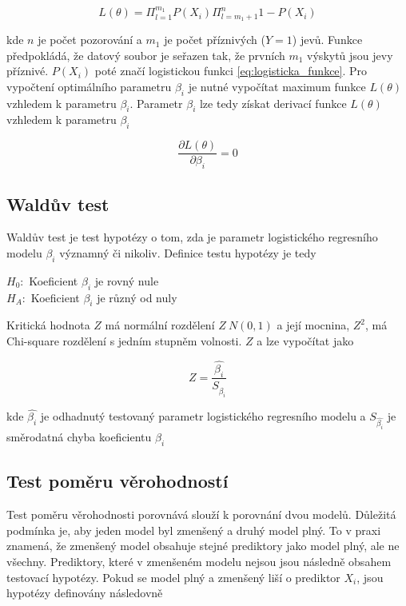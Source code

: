 \begin{equation}
    \label{eq:pravdepodobnostni_fce}
    L(\theta) = \Pi_{l = 1}^{m_1} P(X_i) \Pi_{l = m_1 + 1}^{n} 1 - P(X_i) 
\end{equation}

kde $n$ je počet pozorování a $m_1$ je počet příznivých ($Y = 1$) jevů. Funkce předpokládá, že datový soubor je seřazen tak, že prvních $m_1$ výskytů
jsou jevy příznivé. $P(X_i)$ poté značí logistickou funkci \ref{eq:logisticka_funkce}. Pro vypočtení optimálního parametru $\beta_i$ je nutné vypočítat
maximum funkce $L(\theta)$ vzhledem k parametru $\beta_i$. Parametr $\beta_i$ lze tedy získat derivací funkce $L(\theta)$ vzhledem k parametru $\beta_i$

\begin{equation}
    \frac{\partial L(\theta)}{\partial \beta_i} = 0
\end{equation}

\subsection{Waldův test}
Waldův test je test hypotézy o tom, zda je parametr logistického regresního modelu $\beta_i$ významný či nikoliv. Definice
testu hypotézy je tedy

$H_0:$ Koeficient $\beta_i$ je rovný nule \\
$H_A:$ Koeficient $\beta_i$ je různý od nuly

Kritická hodnota $Z$ má normální rozdělení $Z ~ N(0, 1)$ a její mocnina, $Z^2$, má Chi-square rozdělení s jedním stupněm volnosti.
$Z$ a lze vypočítat jako

\begin{equation}
    Z = \frac{\hat{\beta_i}}{S_{\hat{\beta_i}}}
\end{equation}

kde $\hat{\beta_i}$ je odhadnutý testovaný parametr logistického regresního modelu a $S_{\hat{\beta_i}}$ je směrodatná chyba koeficientu $\beta_i$

\subsection{Test poměru věrohodností}
Test poměru věrohodnosti porovnává slouží k porovnání dvou modelů. Důležitá podmínka je, aby jeden model byl zmenšený a druhý model plný.
To v praxi znamená, že zmenšený model obsahuje stejné prediktory jako model plný, ale ne všechny. Prediktory, které v zmenšeném modelu
nejsou jsou následně obsahem testovací hypotézy. Pokud se model plný a zmenšený liší o prediktor $X_i$, jsou hypotézy definovány následovně

